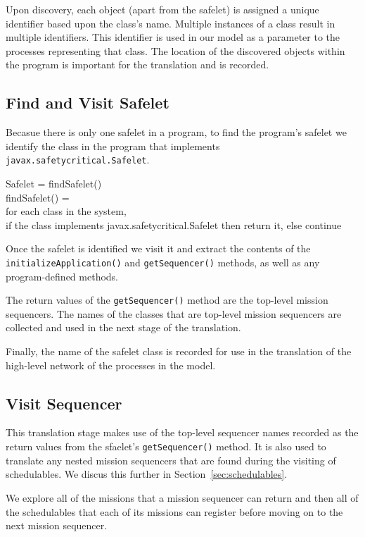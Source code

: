 \documentclass[10pt,a4paper]{article}
\newenvironment{ttSection}{\ttfamily}{\par}
\begin{document}
Upon discovery, each object (apart from the safelet) is assigned a unique identifier based upon the class's name. Multiple instances of a class result in multiple identifiers. This identifier is used in our model as a parameter to the processes representing that class. The location of the discovered objects within the program is important for the translation and is recorded.

\subsection{Find and Visit Safelet}

Becasue there is only one safelet in a program, to find the program's safelet we identify the class in the program that implements \texttt{javax.safetycritical.Safelet}.

\begin{ttSection}
Safelet = findSafelet()\\

findSafelet() = \\
for each class in the system, \\
if the class implements javax.safetycritical.Safelet then return it, else continue
\end{ttSection}

Once the safelet is identified we visit it and extract the contents of the \texttt{initializeApplication()} and \texttt{getSequencer()} methods, as well as any program-defined methods. 

The return values of the \texttt{getSequencer()} method are the top-level mission sequencers. The names of the classes that are top-level mission sequencers are collected and used in the next stage of the translation. 

Finally, the name of the safelet class is recorded for use in the translation of the high-level network of the processes in the model.

\subsection{Visit Sequencer}

This translation stage makes use of the top-level sequencer names recorded as the return values from the sfaelet's \texttt{getSequencer()} method. It is also used to translate any nested mission sequencers that are found during the visiting of schedulables. We discus this further in Section~\ref{sec:schedulables}.

We explore all of the missions that a mission sequencer can return and then all of the schedulables that each of its missions can register before moving on to the next mission sequencer. 
\end{document}

